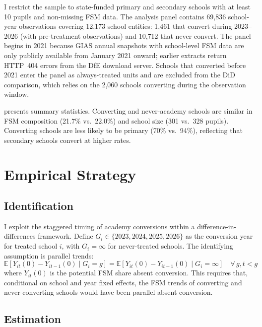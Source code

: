 \documentclass[12pt]{article}
\newcommand{\E}{\mathbb{E}}
\begin{document}
I restrict the sample to state-funded primary and secondary schools with at least 10 pupils and non-missing FSM data. The analysis panel contains 69,836 school-year observations covering 12,173 school entities: 1,461 that convert during 2023--2026 (with pre-treatment observations) and 10,712 that never convert. The panel begins in 2021 because GIAS annual snapshots with school-level FSM data are only publicly available from January 2021 onward; earlier extracts return HTTP~404 errors from the DfE download server. Schools that converted before 2021 enter the panel as always-treated units and are excluded from the DiD comparison, which relies on the 2,060 schools converting during the observation window.



 presents summary statistics. Converting and never-academy schools are similar in FSM composition (21.7\% vs.\ 22.0\%) and school size (301 vs.\ 328 pupils). Converting schools are less likely to be primary (70\% vs.\ 94\%), reflecting that secondary schools convert at higher rates.

\section{Empirical Strategy}

\subsection{Identification}

I exploit the staggered timing of academy conversions within a difference-in-differences framework. Define $G_i \in \{2023, 2024, 2025, 2026\}$ as the conversion year for treated school $i$, with $G_i = \infty$ for never-treated schools. The identifying assumption is parallel trends:
\begin{equation}
\E[Y_{it}(0) - Y_{it-1}(0) \mid G_i = g] = \E[Y_{it}(0) - Y_{it-1}(0) \mid G_i = \infty] \quad \forall\, g, t < g
\end{equation}
where $Y_{it}(0)$ is the potential FSM share absent conversion. This requires that, conditional on school and year fixed effects, the FSM trends of converting and never-converting schools would have been parallel absent conversion.

\subsection{Estimation}
\end{document}
